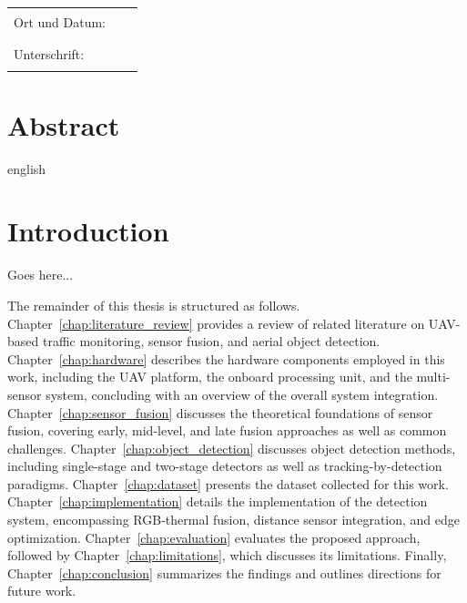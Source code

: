 \documentclass[12pt,oneside,bibtotoc,liststotoc]{scrbook}
\begin{document}
\begin{flushleft}
\begin{tabular}{lll}
Ort und Datum: & & \rule{7cm}{0.4pt}\\[7ex]
Unterschrift: & & \rule{7cm}{0.4pt}
\end{tabular}
\end{flushleft}

\thispagestyle{empty}

\renewcommand{\baselinestretch}{1.00}\normalsize

\tableofcontents
\setcounter{page}{1}
\listoffigures
\renewcommand{\baselinestretch}{1.5}\normalsize

\newpage
\setcounter{page}{1}

\chapter*{Abstract}

\begin{otherlanguage*}{english}
\end{otherlanguage*}





\chapter{Introduction}
Goes here...
\cite{karle2017semantify}

The remainder of this thesis is structured as follows. 
Chapter~\ref{chap:literature_review} provides a review of related 
literature on UAV-based traffic monitoring, sensor fusion, and aerial 
object detection. Chapter~\ref{chap:hardware} describes the hardware 
components employed in this work, including the UAV platform, the 
onboard processing unit, and the multi-sensor system, concluding with 
an overview of the overall system integration. 
Chapter~\ref{chap:sensor_fusion} discusses the theoretical foundations 
of sensor fusion, covering early, mid-level, and late fusion approaches 
as well as common challenges. Chapter~\ref{chap:object_detection} 
discusses object detection methods, including single-stage and 
two-stage detectors as well as tracking-by-detection paradigms. 
Chapter~\ref{chap:dataset} presents the dataset collected for this 
work. Chapter~\ref{chap:implementation} details the implementation 
of the detection system, encompassing RGB-thermal fusion, distance 
sensor integration, and edge optimization. 
Chapter~\ref{chap:evaluation} evaluates the proposed approach, 
followed by Chapter~\ref{chap:limitations}, which discusses its 
limitations. Finally, Chapter~\ref{chap:conclusion} summarizes the 
findings and outlines directions for future work.
\end{document}
